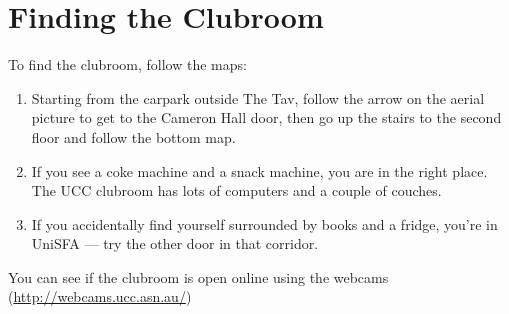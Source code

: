 \chapter{Finding the Clubroom}\label{FindClubroom}


To find the clubroom, follow the maps:

\begin{enumerate}
	\item Starting from the carpark outside The Tav, follow the arrow on the aerial picture to get to the Cameron Hall door, then go up the stairs to the second floor and follow the bottom map.
	\item If you see a coke machine and a snack machine, you are in the right place. The UCC clubroom has lots of computers and a couple of couches.
	\item If you accidentally find yourself surrounded by books and a fridge, you're in UniSFA --- try the other door in that corridor.
\end{enumerate}

You can see if the clubroom is open online using the webcams (\url{http://webcams.ucc.asn.au/})
